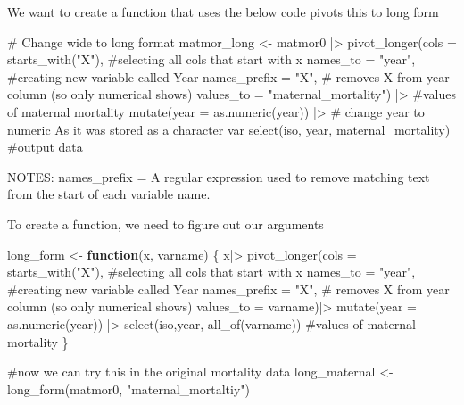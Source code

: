 \documentclass[
  letterpaper,
  DIV=11,
  numbers=noendperiod]{scrartcl}
\newenvironment{Shaded}{\begin{snugshade}}{\end{snugshade}}
\newcommand{\AttributeTok}[1]{\textcolor[rgb]{0.40,0.45,0.13}{#1}}
\newcommand{\CommentTok}[1]{\textcolor[rgb]{0.37,0.37,0.37}{#1}}
\newcommand{\ControlFlowTok}[1]{\textcolor[rgb]{0.00,0.23,0.31}{\textbf{#1}}}
\newcommand{\FunctionTok}[1]{\textcolor[rgb]{0.28,0.35,0.67}{#1}}
\newcommand{\NormalTok}[1]{\textcolor[rgb]{0.00,0.23,0.31}{#1}}
\newcommand{\OtherTok}[1]{\textcolor[rgb]{0.00,0.23,0.31}{#1}}
\newcommand{\SpecialCharTok}[1]{\textcolor[rgb]{0.37,0.37,0.37}{#1}}
\newcommand{\StringTok}[1]{\textcolor[rgb]{0.13,0.47,0.30}{#1}}
\begin{document}
We want to create a function that uses the below code pivots this to
long form

\begin{Shaded}
\begin{Highlighting}[]
\CommentTok{\# Change wide to long format}
\NormalTok{matmor\_long }\OtherTok{\textless{}{-}}\NormalTok{ matmor0 }\SpecialCharTok{|\textgreater{}}
  \FunctionTok{pivot\_longer}\NormalTok{(}\AttributeTok{cols =} \FunctionTok{starts\_with}\NormalTok{(}\StringTok{"X"}\NormalTok{), }\CommentTok{\#selecting all cols that start with x }
                 \AttributeTok{names\_to =} \StringTok{"year"}\NormalTok{, }\CommentTok{\#creating new variable called Year }
                 \AttributeTok{names\_prefix =} \StringTok{"X"}\NormalTok{, }\CommentTok{\# removes X from year column (so only numerical shows)}
                 \AttributeTok{values\_to =} \StringTok{"maternal\_mortality"}\NormalTok{) }\SpecialCharTok{|\textgreater{}} \CommentTok{\#values of maternal mortality }
  \FunctionTok{mutate}\NormalTok{(}\AttributeTok{year =} \FunctionTok{as.numeric}\NormalTok{(year)) }\SpecialCharTok{|\textgreater{}} \CommentTok{\# change year to numeric As it was stored as a character var}
  \FunctionTok{select}\NormalTok{(iso, year, maternal\_mortality) }\CommentTok{\#output data }
\end{Highlighting}
\end{Shaded}

NOTES: names\_prefix = A regular expression used to remove matching text
from the start of each variable name.

To create a function, we need to figure out our arguments

\begin{Shaded}
\begin{Highlighting}[]
\NormalTok{long\_form }\OtherTok{\textless{}{-}} \ControlFlowTok{function}\NormalTok{(x, varname) \{}
\NormalTok{    x}\SpecialCharTok{|\textgreater{}}
    \FunctionTok{pivot\_longer}\NormalTok{(}\AttributeTok{cols =} \FunctionTok{starts\_with}\NormalTok{(}\StringTok{"X"}\NormalTok{), }\CommentTok{\#selecting all cols that start with x }
                 \AttributeTok{names\_to =} \StringTok{"year"}\NormalTok{, }\CommentTok{\#creating new variable called Year }
                 \AttributeTok{names\_prefix =} \StringTok{"X"}\NormalTok{, }\CommentTok{\# removes X from year column (so only numerical shows)}
                 \AttributeTok{values\_to =}\NormalTok{ varname)}\SpecialCharTok{|\textgreater{}}
        \FunctionTok{mutate}\NormalTok{(}\AttributeTok{year =} \FunctionTok{as.numeric}\NormalTok{(year)) }\SpecialCharTok{|\textgreater{}}
        \FunctionTok{select}\NormalTok{(iso,year, }\FunctionTok{all\_of}\NormalTok{(varname)) }\CommentTok{\#values of maternal mortality }
\NormalTok{\} }

\CommentTok{\#now we can try this in the original mortality data}
\NormalTok{long\_maternal }\OtherTok{\textless{}{-}} \FunctionTok{long\_form}\NormalTok{(matmor0, }\StringTok{"maternal\_mortaltiy"}\NormalTok{)}
\end{Highlighting}
\end{Shaded}
\end{document}
